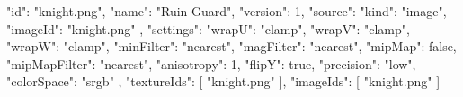 {
  "id": "knight.png",
  "name": "Ruin Guard",
  "version": 1,
  "source": {
    "kind": "image",
    "imageId": "knight.png"
  },
  "settings": {
    "wrapU": "clamp",
    "wrapV": "clamp",
    "wrapW": "clamp",
    "minFilter": "nearest",
    "magFilter": "nearest",
    "mipMap": false,
    "mipMapFilter": "nearest",
    "anisotropy": 1,
    "flipY": true,
    "precision": "low",
    "colorSpace": "srgb"
  },
  "textureIds": [
    "knight.png"
  ],
  "imageIds": [
    "knight.png"
  ]
}
